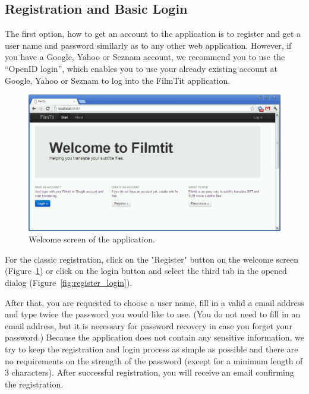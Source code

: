 \subsection{Registration and Basic Login}

The first option, how to get an account to the application is to register and get a user name and password similarly as to any other web application. However, if you have a Google, Yahoo or Seznam account, we recommend you to use the ``OpenID login'', which enables you to use your already existing account at Google, Yahoo or Seznam to log into the FilmTit application.

\begin{figure}[h]
\begin{center}
\includegraphics[scale=0.4]{figures/user_manual/welcome_screen.png}
\end{center}
\caption{Welcome screen of the application.}
\label{fig:welcome}
\end{figure}

For the classic registration, click on the "Register" button on the welcome screen (Figure~\ref{fig:welcome}) or click on the login button and select the third tab in the opened dialog (Figure~\ref{fig:register_login}).

After that, you are requested to choose a user name, fill in a valid a email address and type twice the password you would like to use. (You do not need to fill in an email address, but it is necessary for password recovery in case you forget your password.) Because the application does not contain any sensitive information, we try to keep the registration and login process as simple as possible and there are no requirements on the strength of the password (except for a minimum length of 3 characters). After successful registration, you will receive an email confirming the registration.

